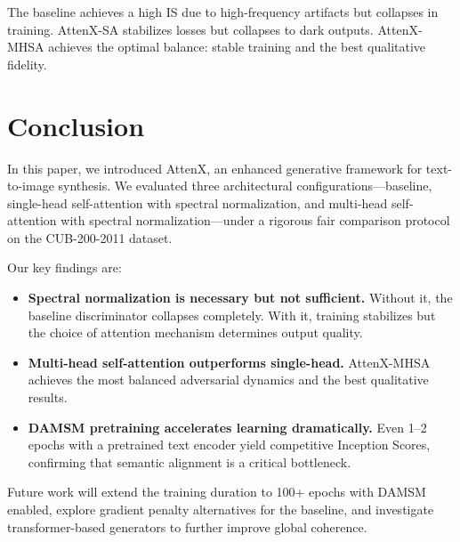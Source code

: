 \documentclass[conference]{IEEEtran}
\begin{document}
The baseline achieves a high IS due to high-frequency artifacts but collapses in training. AttenX-SA stabilizes losses but collapses to dark outputs. AttenX-MHSA achieves the optimal balance: stable training and the best qualitative fidelity.

\section{Conclusion}

In this paper, we introduced AttenX, an enhanced generative framework for text-to-image synthesis. We evaluated three architectural configurations---baseline, single-head self-attention with spectral normalization, and multi-head self-attention with spectral normalization---under a rigorous fair comparison protocol on the CUB-200-2011 dataset.

Our key findings are:
\begin{itemize}
    \item \textbf{Spectral normalization is necessary but not sufficient.} Without it, the baseline discriminator collapses completely. With it, training stabilizes but the choice of attention mechanism determines output quality.
    \item \textbf{Multi-head self-attention outperforms single-head.} AttenX-MHSA achieves the most balanced adversarial dynamics and the best qualitative results.
    \item \textbf{DAMSM pretraining accelerates learning dramatically.} Even 1--2 epochs with a pretrained text encoder yield competitive Inception Scores, confirming that semantic alignment is a critical bottleneck.
\end{itemize}

Future work will extend the training duration to 100+ epochs with DAMSM enabled, explore gradient penalty alternatives for the baseline, and investigate transformer-based generators to further improve global coherence.
\end{document}
